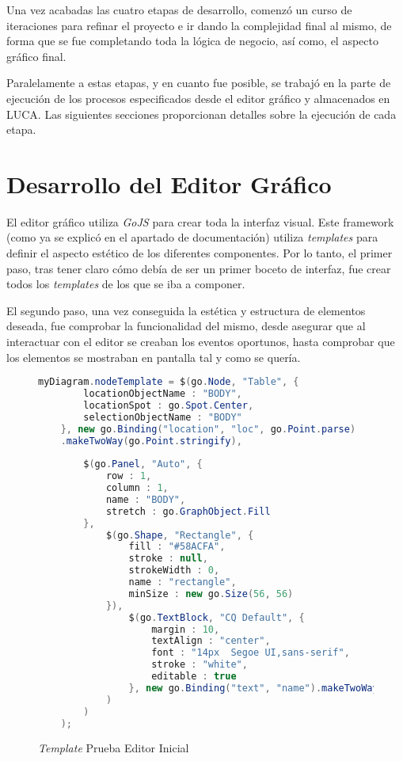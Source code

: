 Una vez acabadas las cuatro etapas de desarrollo, comenzó un curso de iteraciones para refinar el proyecto e ir dando la complejidad final al mismo, de forma que se fue completando toda la lógica de negocio, así como, el aspecto gráfico final.

Paralelamente a estas etapas, y en cuanto fue posible, se trabajó en la parte de ejecución de los procesos especificados desde el editor gráfico y almacenados en LUCA. Las siguientes secciones proporcionan detalles sobre la ejecución de cada etapa.

\section{Desarrollo del Editor Gráfico}

El editor gráfico utiliza \emph{GoJS} para crear toda la interfaz visual. Este framework (como ya se explicó en el apartado de documentación) utiliza \emph{templates} para definir el aspecto estético de los diferentes componentes. Por lo tanto, el primer paso, tras tener claro cómo debía de ser un primer boceto de interfaz, fue crear todos los \emph{templates} de los que se iba a componer.

El segundo paso, una vez conseguida la estética y estructura de elementos deseada, fue comprobar la funcionalidad del mismo, desde asegurar que al interactuar con el editor se creaban los eventos oportunos, hasta comprobar que los elementos se mostraban en pantalla tal y como se quería.

\begin{figure}[H]
	\centering
	\begin{lstlisting}[language=Java]
	myDiagram.nodeTemplate = $(go.Node, "Table", {
		locationObjectName : "BODY",
		locationSpot : go.Spot.Center,
		selectionObjectName : "BODY"
	}, new go.Binding("location", "loc", go.Point.parse)
	.makeTwoWay(go.Point.stringify),
	
		$(go.Panel, "Auto", {
			row : 1,
			column : 1,
			name : "BODY",
			stretch : go.GraphObject.Fill
		},
			$(go.Shape, "Rectangle", {
				fill : "#58ACFA",
				stroke : null,
				strokeWidth : 0,
				name : "rectangle",
				minSize : new go.Size(56, 56)
			}),
				$(go.TextBlock, "CQ Default", {
					margin : 10,
					textAlign : "center",
					font : "14px  Segoe UI,sans-serif",
					stroke : "white",
					editable : true
				}, new go.Binding("text", "name").makeTwoWay()
			)
		)
	);\end{lstlisting}
	\caption{\emph{Template} Prueba Editor Inicial}
	\label{fig:initialSampleEditorCode}
\end{figure}

